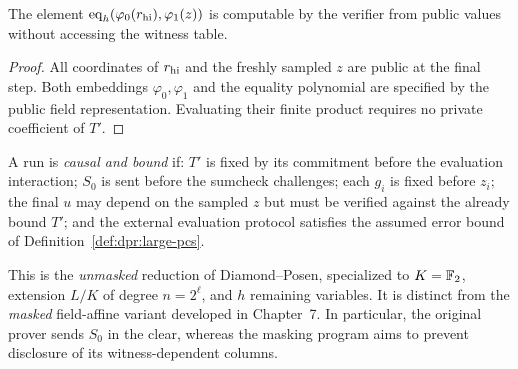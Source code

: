 \begin{lemma}\label{lem:dpr:terminal-public}
The element
$\operatorname{eq}_h(\varphi_0(r_{\rm hi}),\varphi_1(z))$
is computable by the verifier
from public values without
accessing the witness table.
\end{lemma}
\begin{proof}
All coordinates of $r_{\rm hi}$
and the freshly sampled $z$
are public at the final step.
Both embeddings $\varphi_0,\varphi_1$
and the equality polynomial are
specified by the public field
representation. Evaluating their
finite product requires no private
coefficient of $T'$.
\end{proof}

\begin{definition}\label{def:dpr:timing}
A run is \emph{causal and bound} if:
$T'$ is fixed by its commitment before
the evaluation interaction;
$S_0$ is sent before the sumcheck
challenges; each $g_i$ is fixed
before $z_i$; the final $u$ may
depend on the sampled $z$ but
must be verified against the
already bound $T'$; and the
external evaluation protocol satisfies
the assumed error bound of
Definition~\ref{def:dpr:large-pcs}.
\end{definition}

\begin{remark}
This is the \emph{unmasked} reduction
of Diamond--Posen, specialized to
$K=\mathbb{F}_2$, extension $L/K$ of degree
$n=2^\ell$, and $h$ remaining variables.
It is distinct from the \emph{masked}
field-affine variant developed in
Chapter~7. In particular, the
original prover sends $S_0$
in the clear, whereas the masking
program aims to prevent disclosure
of its witness-dependent columns.
\end{remark}
